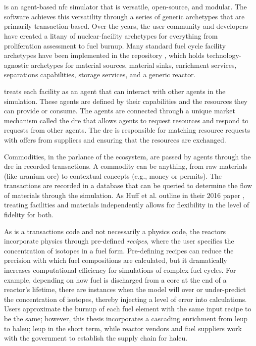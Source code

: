 \section{\cyclus}
\label{sec:cyclus}
\cyclus \cite{huff_cyclus_intro_2016} is an agent-based \gls{nfc} simulator that is versatile, open-source, and modular. The software achieves this versatility through a series of generic archetypes that are primarily transaction-based. Over the years, the user community and developers have created a litany of nuclear-facility archetypes for everything from proliferation assessment to fuel burnup. Many standard fuel cycle facility archetypes have been implemented in the \cycamore repository \cite{Carlsen_cycamore_2014}, which holds technology-agnostic archetypes for material sources, material sinks, enrichment services, separations capabilities, storage services, and a generic reactor.

\cyclus treats each facility as an agent that can interact with other agents in
the simulation. These agents are defined by their capabilities and the resources
they can provide or consume. The agents are connected through a unique market
mechanism called the \gls{dre} that allows agents to request
resources and respond to requests from other agents. The \gls{dre} is responsible for matching resource requests with offers from suppliers and ensuring that the resources are exchanged.

Commodities, in the parlance of the \cyclus ecosystem, are passed by agents through the \gls{dre} in recorded transactions. A commodity can be anything, from raw materials (like uranium ore) to contextual concepts (e.g., money or permits). The transactions are recorded in a database that can be queried to determine the flow of materials through the simulation. As Huff et al. outline in their 2016 paper \cite{huff_cyclus_intro_2016}, treating facilities and materials independently allows for flexibility in the level of fidelity for both.

As \cyclus is a transactions code and not necessarily a physics code,
the reactors incorporate physics through pre-defined \textit{recipes},
where the user specifies the concentration of isotopes in a fuel form.
Pre-defining recipes can reduce the precision with which
fuel compositions are calculated, but it dramatically increases computational
efficiency for simulations of complex fuel cycles. For example, depending
on how fuel is discharged from a core at the end of a reactor's lifetime, there
are instances when the model will over or under-predict the concentration of
isotopes, thereby injecting a level of error into calculations.
Users approximate the burnup of each fuel element with the same input recipe to
be the same; however, this thesis incorporates a cascading enrichment from
\gls{leup} to \gls{haleu}; \gls{leup} in the short term, while reactor vendors
and fuel suppliers work with the government to establish the supply chain for
\gls{haleu}.

